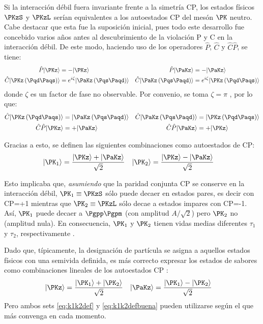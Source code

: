 Si la interacción débil fuera invariante frente a la simetría CP, los estados físicos $\PKzS$ y $\PKzL$ serían equivalentes a los autoestados CP del mesón $\PK$ neutro. Cabe destacar que esta fue la suposición inicial, pues todo este desarrollo fue concebido varios años antes al descubrimiento de la violación P y C en la interacción débil. De este modo, haciendo uso de los operadores $\hat{P}$, $\hat{C}$ y $\hat{C}\hat{P}$, se tiene:
\begin{align}
\hat{P}|\PKz\rangle &= -|\PKz\rangle & \hat{P}|\PaKz\rangle &= -|\PaKz\rangle\\
\hat{C}|\PKz\left(\Pqd\Paqs\right)\rangle &= e^{i\zeta}|\PaKz\left(\Pqs\Paqd\right)\rangle & \hat{C}|\PaKz\left(\Pqs\Paqd\right)\rangle &= e^{i\zeta}|\PKz\left(\Pqd\Paqs\right)\rangle
\end{align}
donde $\zeta$ es un factor de fase no observable. Por convenio, se toma $\zeta=\pi$ \cite{Thomson}, por lo que:
\begin{align}
\hat{C}|\PKz\left(\Pqd\Paqs\right)\rangle &=|\PaKz\left(\Pqs\Paqd\right)\rangle & \hat{C}|\PaKz\left(\Pqs\Paqd\right)\rangle &= |\PKz\left(\Pqd\Paqs\right)\rangle\\
\hat{C}\hat{P}|\PKz\rangle &= +|\PaKz\rangle & \hat{C}\hat{P}|\PaKz\rangle &= +|\PKz\rangle
\end{align}

Gracias a esto, se definen las siguientes combinaciones como autoestados de CP:
\begin{align}
|\PK_{1}\rangle &= \dfrac{|\PKz\rangle + |\PaKz\rangle}{\sqrt{2}} & |\PK_{2}\rangle &= \dfrac{|\PKz\rangle - |\PaKz\rangle}{\sqrt{2}}\label{eq:k1k2def}
\end{align}

Esto implicaba que, \textit{asumiendo} que la paridad conjunta CP se conserve en la interacción débil, $\PK_{1} \equiv \PKzS$ sólo puede decaer en estados pares, es decir con CP=+1 mientras que $\PK_{2} \equiv \PKzL$ sólo decae a estados impares con CP=-1. Así, $\PK_{1}$ puede decaer a $\Pgpp \Pgpm$ (con amplitud $A/ \sqrt{2}$) pero $\PK_{2}$ no (amplitud nula). En consecuencia, $\PK_{1}$ y $\PK_{2}$ tienen vidas medias diferentes $\tau_{1}$ y $\tau_{2}$, respectivamente \cite{Pais} \cite{Perkins}.

Dado que, típicamente, la designación de partícula se asigna a aquellos estados físicos con una semivida definida, es más correcto expresar los estados de sabores como combinaciones lineales de los autoestados CP \cite{Pais}:
\begin{align}
|\PKz\rangle &= \dfrac{|\PK_{1}\rangle + |\PK_{2}\rangle}{\sqrt{2}} & |\PaKz\rangle &= \dfrac{|\PK_{1}\rangle - |\PK_{2}\rangle}{\sqrt{2}}\label{eq:k1k2defbuena}
\end{align}
Pero ambos sets \ref{eq:k1k2def} y \ref{eq:k1k2defbuena} pueden utilizarse según el que más convenga en cada momento.

